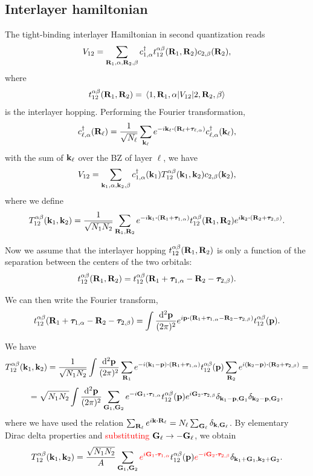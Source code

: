 \documentclass[a4paper,10pt]{article}
\begin{document}
\subsection{Interlayer hamiltonian}

The tight-binding interlayer Hamiltonian in second quantization reads
$$
V_{12} = \sum_{{\vb{R}}_1,\alpha,{\vb{R}}_2,\beta} c_{1,\alpha}^{\dagger} t_{12}^{\alpha\beta}({\vb{R}}_1,{\vb{R}}_2) c_{2,\beta}({\vb{R}}_2),
$$
where
$$
t_{12}^{\alpha\beta}({\vb{R}}_1,{\vb{R}}_2) =
\mel{1,{\vb{R}}_1,\alpha}{V_{12}}{2,{\vb{R}}_2,\beta}
$$
is the interlayer hopping. Performing the Fourier transformation,
$$
c_{\ell,\alpha}^\d(\R_\ell) = \frac{1}{\sqrt{N_\ell}} \sum_{\k_\ell}
e^{-i\k_\ell \vdot (\R_\ell + \vtau_{\ell,\alpha})} c_{\ell,\alpha}^\d(\k_\ell),
$$
with the sum of ${\vb{k}}_\ell$ over the BZ of layer $\ell$, we have
$$
V_{12} = \sum_{{\vb{k}}_1,\alpha,{\vb{k}}_2,\beta} c_{1,\alpha}^{\dagger}({\vb{k}}_1) T_{12}^{\alpha\beta}({\vb{k}}_1,{\vb{k}}_2) c_{2,\beta}({\vb{k}}_2),
$$
where we define
$$
T_{12}^{\alpha\beta}(\k_1,\k_2) =
\frac{1}{\sqrt{N_1 N_2}} \sum_{\R_1,\R_2} e^{-i\k_1\vdot(\R_1+\vtau_{1,\alpha})}
t_{12}^{\alpha\beta}(\R_1,\R_2) e^{i\k_2\vdot(\R_2+\vtau_{2,\beta})}.
$$

Now we assume that the interlayer hopping $t_{12}^{\alpha\beta}({\vb{R}}_1,{\vb{R}}_2)$ is only a function of the separation between the centers of the two orbitals:
$$
t_{12}^{\alpha\beta}({\vb{R}}_1,{\vb{R}}_2) = t_{12}^{\alpha\beta}({\vb{R}}_1+{\bm{\tau}}_{1,\alpha}-{\vb{R}}_2-{\bm{\tau}}_{2,\beta}).
$$

We can then write the Fourier transform,
$$
t_{12}^{\alpha\beta}(\R_1+\vtau_{1,\alpha}-\R_2-\vtau_{2,\beta}) =
\int \frac{\dd[2]{\p}}{(2\pi)^2} e^{i \p \vdot (\R_1+\vtau_{1,\alpha}-\R_2-\vtau_{2,\beta})} t_{12}^{\alpha\beta}(\p).
$$

We have
$$
T_{12}^{\alpha\beta}(\k_1,\k_2) = \frac{1}{\sqrt{N_1 N_2}} \int \frac{\dd[2]{\p}}{(2\pi)^2}
\sum_{\R_1} e^{-i(\k_1-\p)\vdot(\R_1+\vtau_{1,\alpha})} t_{12}^{\alpha\beta}(\p)
\sum_{\R_2} e^{i(\k_2-\p)\vdot(\R_2+\vtau_{2,\beta})} =
$$
$$
= \sqrt{N_1 N_2} \int \frac{\dd[2]{\p}}{(2\pi)^2}
\sum_{\G_1, \G_2} e^{-i\G_1\vdot\vtau_{1,\alpha}} t_{12}^{\alpha\beta}(\p)
e^{i\G_2\vdot\vtau_{2,\beta}} \delta_{\k_1-\p,\G_1} \delta_{\k_2-\p,\G_2},
$$
where we have used the relation $\sum_{\R_\ell} e^{i\k\vdot\R_\ell} = N_\ell \sum_{\G_\ell} \delta_{\k,\G_\ell}$. By elementary Dirac delta properties and \textcolor{red}{substituting ${\vb{G}}_\ell \to -{\vb{G}}_\ell$}, we obtain
$$
T_{12}^{\alpha\beta}(\k_1,\k_2) = \frac{\sqrt{N_1 N_2}}{A}
\sum_{\G_1, \G_2} \textcolor{red}{e^{i\G_1\vdot\vtau_{1,\alpha}}} t_{12}^{\alpha\beta}(\p)
\textcolor{red}{e^{-i\G_2\vdot\vtau_{2,\beta}}} \delta_{\k_1+\G_1, \k_2+\G_2}.
$$
\end{document}
